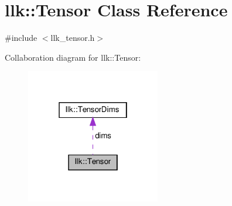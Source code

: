 \hypertarget{classllk_1_1Tensor}{}\section{llk\+:\+:Tensor Class Reference}
\label{classllk_1_1Tensor}


{\ttfamily \#include $<$llk\+\_\+tensor.\+h$>$}



Collaboration diagram for llk\+:\+:Tensor\+:\nopagebreak
\begin{figure}[H]
\begin{center}
\leavevmode
\includegraphics[width=166pt]{classllk_1_1Tensor__coll__graph}
\end{center}
\end{figure}
